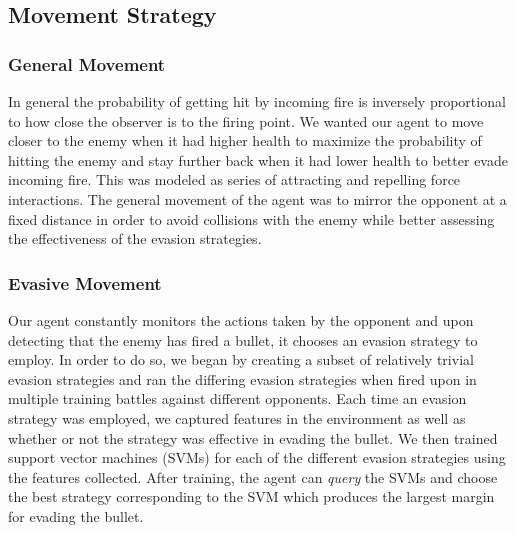 \documentclass{article}
\theoremstyle{plain}
\theoremstyle{definition}
\theoremstyle{remark}
\begin{document}
\subsection*{Movement Strategy}





\subsubsection*{General Movement }
In general the probability of getting hit by incoming fire is inversely proportional to how close the observer is to the firing point. We wanted our agent to move closer to the enemy when it had higher health to maximize the probability of hitting the enemy and stay further back when it had lower health to better evade incoming fire. This was modeled as series of attracting and repelling force interactions. The general movement of the agent was to mirror the opponent at a fixed distance in order to avoid collisions with the enemy while better assessing the effectiveness of the evasion strategies. 

\subsubsection*{Evasive Movement }
Our agent constantly monitors the actions taken by the opponent and upon detecting that the enemy has fired a bullet, it chooses an evasion strategy to employ. In order to do so, we began by creating a subset of relatively trivial evasion strategies and ran the differing evasion strategies when fired upon in multiple training battles against different opponents. Each time an evasion strategy was employed, we captured features in the environment as well as whether or not the strategy was effective in evading the bullet. We then trained support vector machines (SVMs) for each of the different evasion strategies using the features collected. After training, the agent can \emph{query} the SVMs and choose the best strategy corresponding to the SVM which produces the largest margin for evading the bullet. 
\end{document}
